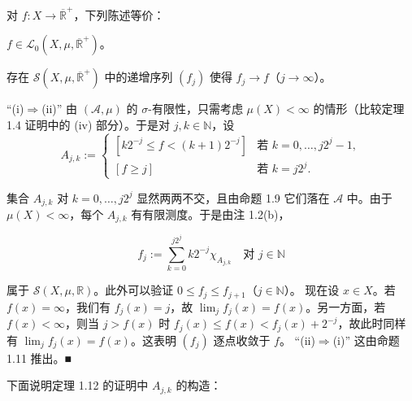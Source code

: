 \begin{theorem}

对 $ f: X \to \overline{\mathbb{R}}^{+} $，下列陈述等价：

\begin{subitems}
\item

$ f \in \mathcal{L}_0(X,\mu,\overline{\mathbb{R}}^{+}) $。

\item

存在 $ \mathcal{S}(X,\mu,\overline{\mathbb{R}}^{+}) $ 中的递增序列 $ (f_j) $ 使得 $ f_j \to f $（$ j \to \infty $）。

\proofhead
“(i)$ \Rightarrow $(ii)” 由 $ (\mathcal{A},\mu) $ 的 $ \sigma $-有限性，只需考虑 $ \mu(X) < \infty $ 的情形（比较定理 1.4 证明中的 (iv) 部分）。于是对 $ j, k \in \mathbb{N} $，设
\begin{equation*}
A_{j,k} := \begin{cases} [k2^{-j} \le f < (k+1)2^{-j}] & \text{若 } k = 0,\ldots,j2^{j} - 1 , \\ [f \ge j] & \text{若 } k = j2^{j} . \end{cases}
\end{equation*}

集合 $ A_{j,k} $ 对 $ k = 0,\ldots,j2^{j} $ 显然两两不交，且由命题 1.9 它们落在 $ \mathcal{A} $ 中。由于 $ \mu(X) < \infty $，每个 $ A_{j,k} $ 有有限测度。于是由注 1.2(b)，

\[
f_j := \sum_{k=0}^{j2^{j}} k2^{-j} \chi_{A_{j,k}} \quad \text{对 } j \in \mathbb{N}
\]

属于 $ \mathcal{S}(X,\mu,\mathbb{R}) $。此外可以验证 $ 0 \le f_j \le f_{j+1} $（$ j \in \mathbb{N} $）。
现在设 $ x \in X $。若 $ f(x) = \infty $，我们有 $ f_j(x) = j $，故 $ \lim_j f_j(x) = f(x) $。另一方面，若 $ f(x) < \infty $，则当 $ j > f(x) $ 时 $ f_j(x) \le f(x) < f_j(x) + 2^{-j} $，故此时同样有 $ \lim_j f_j(x) = f(x) $。这表明 $ (f_j) $ 逐点收敛于 $ f $。
“(ii)$ \Rightarrow $(i)” 这由命题 1.11 推出。\nobreak\hspace{0.35em}■

\end{subitems}

\end{theorem}

下面说明定理 1.12 的证明中 $ A_{j,k} $ 的构造：


